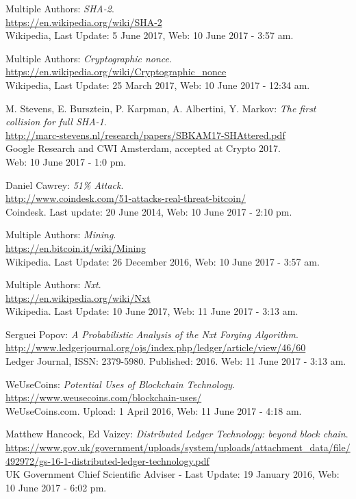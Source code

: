 \documentclass[paper=a4, fontsize=11pt]{scrartcl} %
\numberwithin{equation}{section} %
\numberwithin{figure}{section} %
\numberwithin{table}{section} %
\begin{document}
\begin{thebibliography}{9}
Multiple Authors:
\textit{SHA-2}.\\
\url{https://en.wikipedia.org/wiki/SHA-2}\\ 
Wikipedia, Last Update: 5 June 2017, Web: 10 June 2017 - 3:57 am.

Multiple Authors:
\textit{Cryptographic nonce}.\\
\url{https://en.wikipedia.org/wiki/Cryptographic_nonce}\\ 
Wikipedia, Last Update: 25 March 2017, Web: 10 June 2017 - 12:34 am.

M. Stevens, E. Bursztein, P. Karpman, A. Albertini, Y. Markov:
\textit{The first collision for full SHA-1}.\\
\url{http://marc-stevens.nl/research/papers/SBKAM17-SHAttered.pdf}\\ 
Google Research and CWI Amsterdam, accepted at Crypto 2017. \\Web: 10 June 2017 - 1:0 pm.

 Daniel Cawrey:
\textit{51\% Attack}.\\
\url{http://www.coindesk.com/51-attacks-real-threat-bitcoin/}\\ 
Coindesk. Last update: 20 June 2014, Web: 10 June 2017 - 2:10 pm.


Multiple Authors:
\textit{Mining}.\\
\url{https://en.bitcoin.it/wiki/Mining}\\ 
Wikipedia. Last Update: 26 December 2016, Web: 10 June 2017 - 3:57 am.

Multiple Authors:
\textit{Nxt}.\\
\url{https://en.wikipedia.org/wiki/Nxt}\\
Wikipedia. Last Update: 10 June 2017, Web: 11 June 2017 - 3:13 am.

Serguei Popov:
\textit{A Probabilistic Analysis of the Nxt Forging Algorithm}.\\
\url{http://www.ledgerjournal.org/ojs/index.php/ledger/article/view/46/60}\\
Ledger Journal, ISSN: 2379-5980. Published: 2016. Web: 11 June 2017 - 3:13 am.


WeUseCoins:
\textit{Potential Uses of Blockchain Technology}.\\
\url{https://www.weusecoins.com/blockchain-uses/}\\
WeUseCoins.com. Upload: 1 April 2016, Web: 11 June 2017 - 4:18 am.

Matthew Hancock, Ed Vaizey:
\textit{Distributed Ledger Technology:
beyond block chain}.\\
\url{https://www.gov.uk/government/uploads/system/uploads/attachment_data/file/492972/gs-16-1-distributed-ledger-technology.pdf}\\ 
UK Government Chief Scientific Adviser - Last Update: 19 January 2016, Web: 10 June 2017 - 6:02 pm.

\end{thebibliography}
\end{document}
